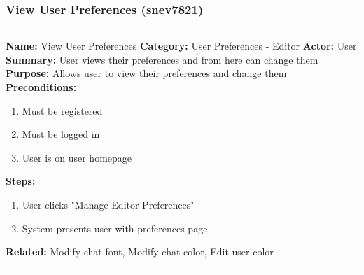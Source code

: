 \documentclass[11pt]{report}
\begin{document}
\subsubsection{View User Preferences (snev7821)}
\vspace{2pt}
\hrule
\vspace{8pt}
	\noindent\textbf{Name:} View User Preferences \newline
	\textbf{Category:} User Preferences - Editor  \newline
	\textbf{Actor:} User \newline
	\textbf{Summary:} User views their preferences and from here can change them \newline
	\textbf{Purpose:} Allows user to view their preferences and change them \newline
	\textbf{Preconditions:}
	\begin{enumerate}
		\item Must be registered
		\item Must be logged in
		\item User is on user homepage
	\end{enumerate}
	\textbf{Steps:}
	\begin{enumerate}
		\item User clicks "Manage Editor Preferences"
		\item System presents user with preferences page
	\end{enumerate}
	\textbf{Related:} Modify chat font, Modify chat color, Edit user color
\vspace{8pt}
\hrule
\newpage
\end{document}
